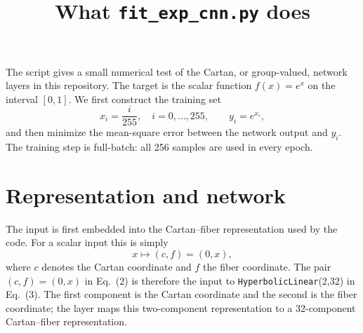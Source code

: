\documentclass[10pt]{article}
\title{What \texttt{fit\_exp\_cnn.py} does}
\author{}
\date{}
\begin{document}
\maketitle

The script gives a small numerical test of the Cartan, or group-valued,
network layers in this repository.  The target is the scalar function
\(f(x)=e^x\) on the interval \([0,1]\).  We first construct the training set
\begin{equation}
 x_i=\frac{i}{255},\quad i=0,\ldots,255,
 \qquad y_i=e^{x_i},
\end{equation}
and then minimize the mean-square error between the network output and \(y_i\).
The training step is full-batch: all 256 samples are used in every epoch.

\section{Representation and network}

The input is first embedded into the Cartan--fiber representation used by the
code.  For a scalar input this is simply
\begin{equation}
 x \longmapsto (c,f)=(0,x),
\end{equation}
where \(c\) denotes the Cartan coordinate and \(f\) the fiber coordinate.
The pair \((c,f)=(0,x)\) in Eq.~(2) is therefore the input to
\texttt{HyperbolicLinear}(2,32) in Eq.~(3).  The first component is the Cartan
coordinate and the second is the fiber coordinate; the layer maps this
two-component representation to a 32-component Cartan--fiber representation.

\noindent{}
\end{document}
